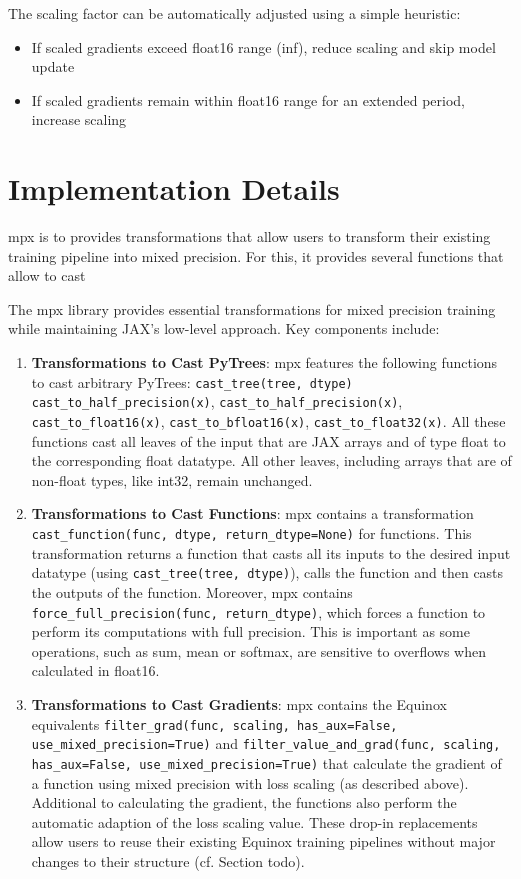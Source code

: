 \documentclass[11pt,a4paper]{article}
\begin{document}
The scaling factor can be automatically adjusted using a simple heuristic:
\begin{itemize}
    \item If scaled gradients exceed float16 range (inf), reduce scaling and skip model update
    \item If scaled gradients remain within float16 range for an extended period, increase scaling
\end{itemize}

\section{Implementation Details}
mpx is to provides transformations that allow users to transform their existing training pipeline into mixed precision.
For this, it provides several functions that allow to cast

The mpx library provides essential transformations for mixed precision training while maintaining JAX's low-level approach. Key components include:

\begin{enumerate}
    \item \textbf{Transformations to Cast PyTrees}: mpx features the following functions to cast arbitrary PyTrees: \texttt{cast\_tree(tree, dtype)} \texttt{cast\_to\_half\_precision(x)}, \texttt{cast\_to\_half\_precision(x)}, \texttt{cast\_to\_float16(x)}, \texttt{cast\_to\_bfloat16(x)}, \texttt{cast\_to\_float32(x)}. All these functions cast all leaves of the input that are JAX arrays and of type float to the corresponding float datatype. All other leaves, including arrays that are of non-float types, like int32, remain unchanged. 
    \item \textbf{Transformations to Cast Functions}: mpx contains a transformation \texttt{cast\_function(func, dtype, return\_dtype=None)} for functions. This transformation returns a function that casts all its inputs to the desired input datatype (using \texttt{cast\_tree(tree, dtype)}), calls the function and then casts the outputs of the function. Moreover, mpx contains \texttt{force\_full\_precision(func, return\_dtype)}, which forces a function to perform its computations with full precision. This is important as some operations, such as sum, mean or softmax, are sensitive to overflows when calculated in float16.
    \item \textbf{Transformations to Cast Gradients}: mpx contains the Equinox equivalents \texttt{filter\_grad(func, scaling, has\_aux=False, use\_mixed\_precision=True)} and \texttt{filter\_value\_and\_grad(func, scaling, has\_aux=False, use\_mixed\_precision=True)} that calculate the gradient of a function using mixed precision with loss scaling (as described above). Additional to calculating the gradient, the functions also perform the automatic adaption of the loss scaling value.
    These drop-in replacements allow users to reuse their existing Equinox training pipelines without major changes to their structure (cf. Section todo).
\end{enumerate}
\end{document}

